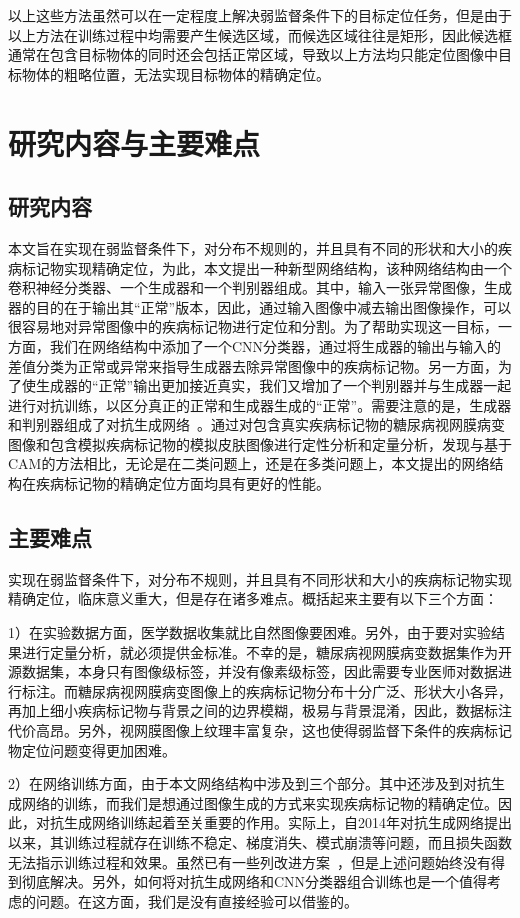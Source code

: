 以上这些方法虽然可以在一定程度上解决弱监督条件下的目标定位任务，但是由于以上方法在训练过程中均需要产生候选区域，而候选区域往往是矩形，因此候选框通常在包含目标物体的同时还会包括正常区域，导致以上方法均只能定位图像中目标物体的粗略位置，无法实现目标物体的精确定位。

\section{研究内容与主要难点}\label{sec:existing_diffcuities}
\subsection{研究内容}
本文旨在实现在弱监督条件下，对分布不规则的，并且具有不同的形状和大小的疾病标记物实现精确定位，为此，本文提出一种新型网络结构，该种网络结构由一个卷积神经分类器、一个生成器和一个判别器组成。其中，输入一张异常图像，生成器的目的在于输出其“正常”版本，因此，通过输入图像中减去输出图像操作，可以很容易地对异常图像中的疾病标记物进行定位和分割。为了帮助实现这一目标，一方面，我们在网络结构中添加了一个CNN分类器，通过将生成器的输出与输入的差值分类为正常或异常来指导生成器去除异常图像中的疾病标记物。另一方面，为了使生成器的“正常”输出更加接近真实，我们又增加了一个判别器并与生成器一起进行对抗训练，以区分真正的正常和生成器生成的“正常”。需要注意的是，生成器和判别器组成了对抗生成网络~\cite{goodfellow2014generative}。通过对包含真实疾病标记物的糖尿病视网膜病变图像和包含模拟疾病标记物的模拟皮肤图像进行定性分析和定量分析，发现与基于CAM的方法相比，无论是在二类问题上，还是在多类问题上，本文提出的网络结构在疾病标记物的精确定位方面均具有更好的性能。

\subsection{主要难点}\label{sec:difficulties}
实现在弱监督条件下，对分布不规则，并且具有不同形状和大小的疾病标记物实现精确定位，临床意义重大，但是存在诸多难点。概括起来主要有以下三个方面：

1）在实验数据方面，医学数据收集就比自然图像要困难。另外，由于要对实验结果进行定量分析，就必须提供金标准。不幸的是，糖尿病视网膜病变数据集作为开源数据集，本身只有图像级标签，并没有像素级标签，因此需要专业医师对数据进行标注。而糖尿病视网膜病变图像上的疾病标记物分布十分广泛、形状大小各异，再加上细小疾病标记物与背景之间的边界模糊，极易与背景混淆，因此，数据标注代价高昂。另外，视网膜图像上纹理丰富复杂，这也使得弱监督下条件的疾病标记物定位问题变得更加困难。

2）在网络训练方面，由于本文网络结构中涉及到三个部分。其中还涉及到对抗生成网络的训练，而我们是想通过图像生成的方式来实现疾病标记物的精确定位。因此，对抗生成网络训练起着至关重要的作用。实际上，自2014年对抗生成网络提出以来，其训练过程就存在训练不稳定、梯度消失、模式崩溃等问题，而且损失函数无法指示训练过程和效果。虽然已有一些列改进方案~\cite{mirza2014conditional, radford2015unsupervised, arjovsky2017wasserstein, gulrajani2017improved, mao2017least}，但是上述问题始终没有得到彻底解决。另外，如何将对抗生成网络和CNN分类器组合训练也是一个值得考虑的问题。在这方面，我们是没有直接经验可以借鉴的。

